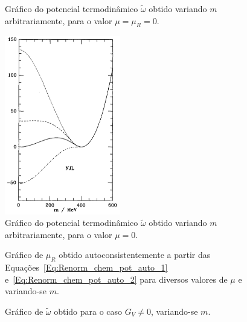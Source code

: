 
\begin{figure}
	
	\caption{Gráfico do potencial termodinâmico $\tilde{\omega}$ obtido variando $m$ arbitrariamente, para o valor $\mu = \mu_R = 0$. \protect}
	\label{Fig:pot_term_analysys_NJL-Buballa_Set_1}
\end{figure}

\begin{figure}
	\centering
	\includegraphics[width=0.45\textwidth]{graphics/Therm_pot_analysis/Pot_buballa.png}
	\caption{Gráfico do potencial termodinâmico $\tilde{\omega}$ obtido variando $m$ arbitrariamente, para o valor $\mu = 0$.}
	\label{Fig:pot_term_analysys_Buballa_NJL-Buballa_Set_1}
\end{figure}

\begin{figure}
	
	\caption{Gráfico de $\mu_R$ obtido autoconsistentemente a partir das Equações~\eqref{Eq:Renorm_chem_pot_auto_1} e~\eqref{Eq:Renorm_chem_pot_auto_2} para diversos valores de $\mu$ e variando-se $m$. \protect}
	\label{Fig:Renorm_chem_pot}
\end{figure}

\begin{figure}
	
	\caption{Gráfico de $\tilde\omega$ obtido para o caso $G_V \neq 0$, variando-se $m$. \protect}
	\label{Fig:Fig2.8RBubR_repro}
\end{figure}

